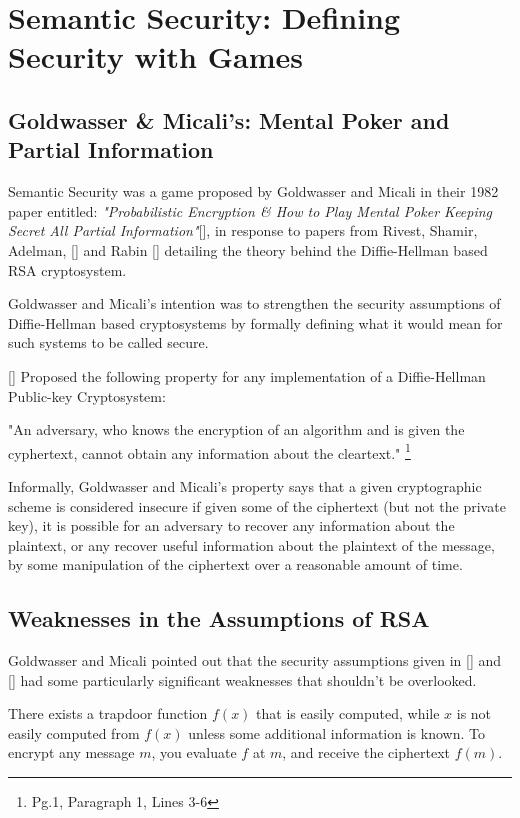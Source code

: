 \section{Semantic Security: Defining Security with Games} 

\subsection{Goldwasser \& Micali's: Mental Poker and Partial Information} 


Semantic Security was a game proposed by Goldwasser and Micali in their 1982 paper entitled: \textit{"Probabilistic Encryption \& How to Play Mental Poker Keeping Secret All Partial Information"}[\cite{Gol19820}], in response to papers from Rivest, Shamir, Adelman, [\cite{Riv19780}] and Rabin [\cite{Rab19790}] detailing the theory behind the Diffie-Hellman based RSA cryptosystem. 

Goldwasser and Micali's intention was to strengthen the security assumptions of Diffie-Hellman based cryptosystems by formally defining what it would mean for such systems to be called secure. 


[\cite{Gol19820}] Proposed the following property for any implementation of a Diffie-Hellman Public-key Cryptosystem:  
\begin{prop}{"An adversary, who knows the encryption of an algorithm and is given the cyphertext, cannot obtain any information about the cleartext."} \footnote{\cite{Gol1982} Pg.1, Paragraph 1, Lines 3-6} 
\end{prop}


Informally, Goldwasser and Micali's property says that a given cryptographic scheme is considered insecure if given some of the ciphertext (but not the private key), it is possible for an adversary to recover any information about the plaintext, or any recover useful information about the plaintext of the message, by some manipulation of the ciphertext over a reasonable amount of time. 


\subsection{Weaknesses in the Assumptions of RSA} 


Goldwasser and Micali pointed out that the security assumptions given in [\cite{Rab19790}] and  [\cite{Riv19780}] had some particularly significant weaknesses that shouldn't be overlooked.


\begin{asu}
There exists a trapdoor function $f(x)$ that is easily computed, while $x$ is not easily computed from $f(x)$ unless some additional information is known. To encrypt any message $m$, you evaluate $f$ at $m$, and receive the ciphertext $f(m)$.
\end{asu}


